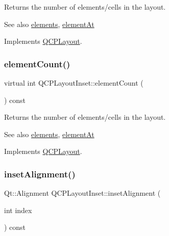 Returns the number of elements/cells in the layout.

\begin{DoxySeeAlso}{See also}
\hyperlink{class_q_c_p_layout_aca129722c019f91d3367046f80abfa77}{elements}, \hyperlink{class_q_c_p_layout_inset_a881ca205605bae9c034733b808f93a02}{element\+At} 
\end{DoxySeeAlso}


Implements \hyperlink{class_q_c_p_layout_a39d3e9ef5d9b82ab1885ba1cb9597e56}{Q\+C\+P\+Layout}.

\mbox{\label{class_q_c_p_layout_inset_a4096aa1dc77ff54fc76df8e30b6d9e1b}} 
\subsubsection{\texorpdfstring{element\+Count()}{elementCount()}\hspace{0.1cm}{\footnotesize\ttfamily [2/2]}}
{\footnotesize\ttfamily virtual int Q\+C\+P\+Layout\+Inset\+::element\+Count (\begin{DoxyParamCaption}{ }\end{DoxyParamCaption}) const\hspace{0.3cm}{\ttfamily [virtual]}}

Returns the number of elements/cells in the layout.

\begin{DoxySeeAlso}{See also}
\hyperlink{class_q_c_p_layout_aca129722c019f91d3367046f80abfa77}{elements}, \hyperlink{class_q_c_p_layout_inset_a881ca205605bae9c034733b808f93a02}{element\+At} 
\end{DoxySeeAlso}


Implements \hyperlink{class_q_c_p_layout_a39d3e9ef5d9b82ab1885ba1cb9597e56}{Q\+C\+P\+Layout}.

\mbox{\label{class_q_c_p_layout_inset_a5b33b66f0abbb4a7cc2f8aa6c94cf7f8}} 
\subsubsection{\texorpdfstring{inset\+Alignment()}{insetAlignment()}}
{\footnotesize\ttfamily Qt\+::\+Alignment Q\+C\+P\+Layout\+Inset\+::inset\+Alignment (\begin{DoxyParamCaption}\item[{int}]{index }\end{DoxyParamCaption}) const}

